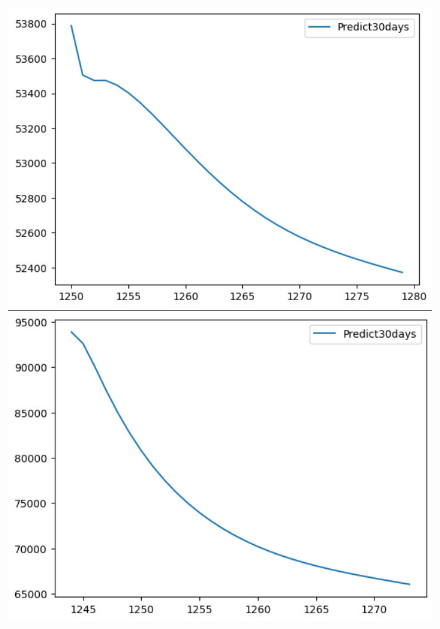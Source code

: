 \begin{figure}[H]
\begin{minipage}{0.15\textwidth}
    \end{minipage}
    \hfill
        \begin{minipage}{0.15\textwidth}
    \centering
    \includegraphics[width=1\textwidth]{resources/chapter-5/predicted/BIDV_LSTM_9_1_next30days.jpg}
    \end{minipage}
    \hfill
    \begin{minipage}{0.15\textwidth}
    \centering
    \includegraphics[width=1\textwidth]{resources/chapter-5/predicted/VCB_LSTM_7_3_next30days.jpg}
    \end{minipage}
    \hfill
    \begin{minipage}{0.15\textwidth}
    \centering

\end{minipage}
\end{figure}
